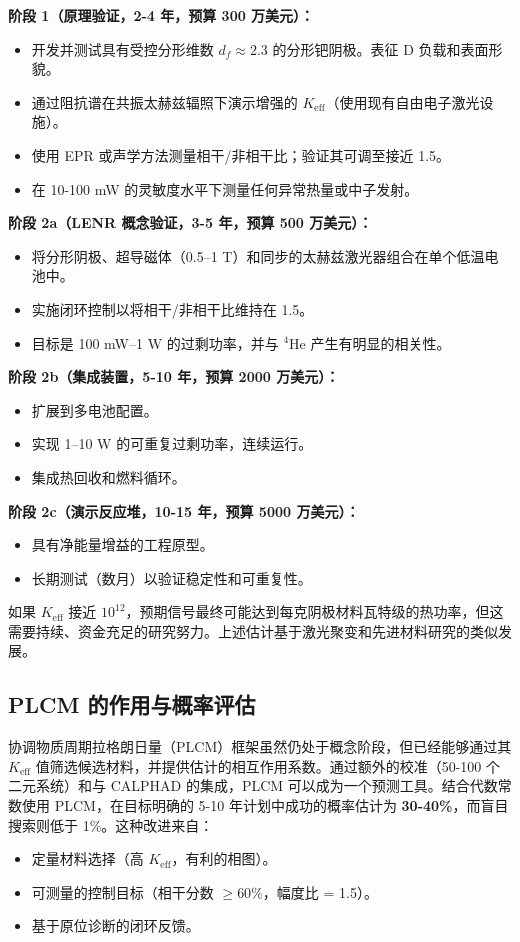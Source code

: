 \documentclass[12pt]{article}
\theoremstyle{remark}
\newcommand{\Keff}{K_{\mathrm{eff}}}
\begin{document}
	\textbf{阶段 1（原理验证，2-4 年，预算 300 万美元）：}
	\begin{itemize}
		\item 开发并测试具有受控分形维数 \(d_f \approx 2.3\) 的分形钯阴极。表征 D 负载和表面形貌。
		\item 通过阻抗谱在共振太赫兹辐照下演示增强的 \(\Keff\)（使用现有自由电子激光设施）。
		\item 使用 EPR 或声学方法测量相干/非相干比；验证其可调至接近 1.5。
		\item 在 10-100 mW 的灵敏度水平下测量任何异常热量或中子发射。
	\end{itemize}
	
	\textbf{阶段 2a（LENR 概念验证，3-5 年，预算 500 万美元）：}
	\begin{itemize}
		\item 将分形阴极、超导磁体（0.5–1 T）和同步的太赫兹激光器组合在单个低温电池中。
		\item 实施闭环控制以将相干/非相干比维持在 1.5。
		\item 目标是 100 mW–1 W 的过剩功率，并与 \(^4\)He 产生有明显的相关性。
	\end{itemize}
	
	\textbf{阶段 2b（集成装置，5-10 年，预算 2000 万美元）：}
	\begin{itemize}
		\item 扩展到多电池配置。
		\item 实现 1–10 W 的可重复过剩功率，连续运行。
		\item 集成热回收和燃料循环。
	\end{itemize}
	
	\textbf{阶段 2c（演示反应堆，10-15 年，预算 5000 万美元）：}
	\begin{itemize}
		\item 具有净能量增益的工程原型。
		\item 长期测试（数月）以验证稳定性和可重复性。
	\end{itemize}
	
	如果 \(\Keff\) 接近 \(10^{12}\)，预期信号最终可能达到每克阴极材料瓦特级的热功率，但这需要持续、资金充足的研究努力。上述估计基于激光聚变和先进材料研究的类似发展。
	
	\subsection{PLCM 的作用与概率评估}
	
	协调物质周期拉格朗日量（PLCM）框架虽然仍处于概念阶段，但已经能够通过其 \(K_{\mathrm{eff}}\) 值筛选候选材料，并提供估计的相互作用系数。通过额外的校准（50-100 个二元系统）和与 CALPHAD 的集成，PLCM 可以成为一个预测工具。结合代数常数使用 PLCM，在目标明确的 5-10 年计划中成功的概率估计为 \textbf{30-40\%}，而盲目搜索则低于 1\%。这种改进来自：
	\begin{itemize}
		\item 定量材料选择（高 \(K_{\mathrm{eff}}\)，有利的相图）。
		\item 可测量的控制目标（相干分数 \(\geq 60\%\)，幅度比 = 1.5）。
		\item 基于原位诊断的闭环反馈。
	\end{itemize}
	
\end{document}
